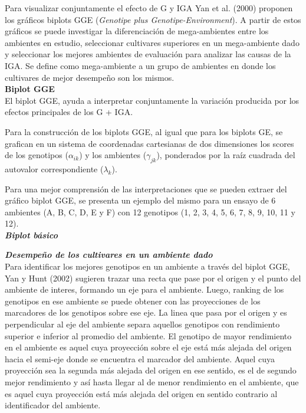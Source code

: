 Para visualizar conjuntamente el efecto de G y IGA Yan et al. (2000) proponen los gráficos biplots GGE (\emph{Genotipe plus Genotipe-Environment}). A partir de estos gráficos se puede investigar la diferenciación de mega-ambientes entre los ambientes en estudio, seleccionar cultivares superiores en un mega-ambiente dado y seleccionar los mejores ambientes de evaluación para analizar las causas de la IGA. Se define como mega-ambiente a un grupo de ambientes en donde los cultivares de mejor desempeño son los mismos.\\


\textbf{Biplot GGE}\\


El biplot GGE, ayuda a interpretar conjuntamente la variación producida por los efectos principales de los G + IGA.

Para la construcción de los biplots GGE, al igual que para los biplots GE, se grafican en un sistema de coordenadas cartesianas de dos dimensiones los scores de los genotipos ($\alpha_{ik}$) y los ambientes ($\gamma_{jk}$), ponderados por la raíz cuadrada del autovalor correspondiente ($\lambda_k$).

Para una mejor comprensión de las interpretaciones que se pueden extraer del gráfico biplot GGE, se presenta un ejemplo del mismo para un ensayo de 6 ambientes (A, B, C, D, E y F) con 12 genotipos (1, 2, 3, 4, 5, 6, 7, 8, 9, 10, 11 y 12).\\

\textbf{\emph{Biplot básico}}




\textbf{\emph{Desempeño de los cultivares en un ambiente dado}}\\

Para identificar los mejores genotipos en un ambiente a través del biplot GGE, Yan y Hunt (2002) sugieren trazar una recta que pase por el origen y el punto del ambiente de interes, formando un eje para el ambiente. Luego, ranking de los genotipos en ese ambiente se puede obtener con las proyecciones de los marcadores de los genotipos sobre ese eje. La linea que pasa por el origen y es perpendicular al eje del ambiente separa aquellos genotipos con rendimiento superior e inferior al promedio del ambiente. El genotipo de mayor rendimiento en el ambiente es aquel cuya proyección sobre el eje está más alejada del origen hacia el semi-eje donde se encuentra el marcador del ambiente. Aquel cuya proyección sea la segunda más alejada del origen en ese sentido, es el de segundo mejor rendimiento y así hasta llegar al de menor rendimiento en el ambiente, que es aquel cuya proyección está más alejada del origen en sentido contrario al identificador del ambiente. 

